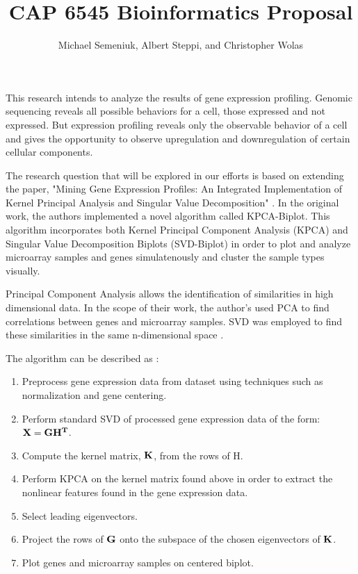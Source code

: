 \documentclass[10pt,a4,oneside]{report}
\begin{document}
\title{CAP 6545 Bioinformatics Proposal}
\author{Michael Semeniuk, Albert Steppi, and  Christopher Wolas}
\maketitle
This research intends to analyze the results of gene expression profiling. Genomic sequencing reveals all possible behaviors for a cell, those expressed and not expressed. But expression profiling reveals only the observable behavior of a cell and gives the opportunity to observe upregulation and downregulation of certain cellular components.

The research question that will be explored in our efforts is based on extending the paper, "Mining Gene Expression Profiles: An Integrated Implementation of Kernel Principal Analysis and Singular Value Decomposition" \cite{Reverter2010200}.  In the original work, the authors implemented a novel algorithm called KPCA-Biplot. This algorithm incorporates both Kernel Principal Component Analysis (KPCA) and Singular Value Decomposition Biplots (SVD-Biplot) in order to plot and analyze microarray samples and genes simulatenously and cluster the sample types visually. 

Principal Component Analysis allows the identification of similarities in high dimensional data. In the scope of their work, the author's used PCA to find correlations between genes and microarray samples. SVD was employed to find these similarities in the same n-dimensional space \cite{Reverter2010200}.

The algorithm can be described as \cite{Reverter2010200}:

\begin{enumerate}  \itemsep -2pt %
\item
Preprocess gene expression data from dataset using techniques such as normalization and gene centering.
\item 
Perform standard SVD of processed gene expression data of the form: $\bf{X} = \bf{G}\bf{H}^{T}$.
\item
Compute the kernel matrix, $\bf{K}$, from  the rows of H.
\item
Perform KPCA on the kernel matrix found above in order to extract the nonlinear features found in the gene expression data.
\item
Select leading eigenvectors.
\item
Project the rows of $\bf{G}$ onto the subspace of the chosen eigenvectors of $\bf{K}$.
\item
Plot genes and microarray samples on centered biplot.
\end{enumerate}
\end{document}
